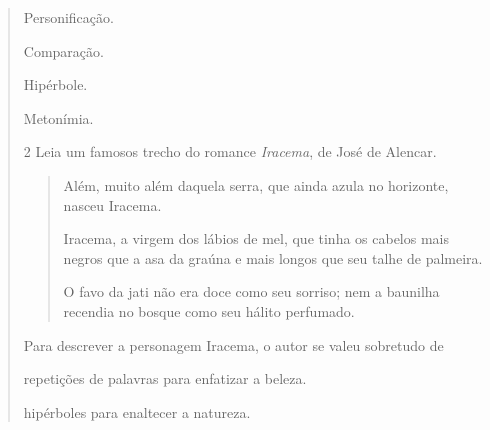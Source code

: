{\begin{quote}
{\begin{escolha}

  \item Personificação.
  
  \item Comparação.
  
  \item Hipérbole.
  
  \item Metonímia. 

\end{escolha}


\num{2} Leia um famosos trecho do romance \textit{Iracema}, de José de Alencar.

\begin{quote}

Além, muito além daquela serra, que ainda azula no
horizonte, nasceu Iracema.

Iracema, a virgem dos lábios de mel, que tinha os
cabelos mais negros que a asa da graúna e mais longos
que seu talhe de palmeira.

O favo da jati não era doce como seu sorriso; nem
a baunilha recendia no bosque como seu hálito perfumado.

\end{quote}


Para descrever a personagem Iracema, o autor se valeu sobretudo de

\begin{escolha}

  \item repetições de palavras para enfatizar a beleza. 

  \item hipérboles para enaltecer a natureza.


\end{escolha}}
\end{quote}}
